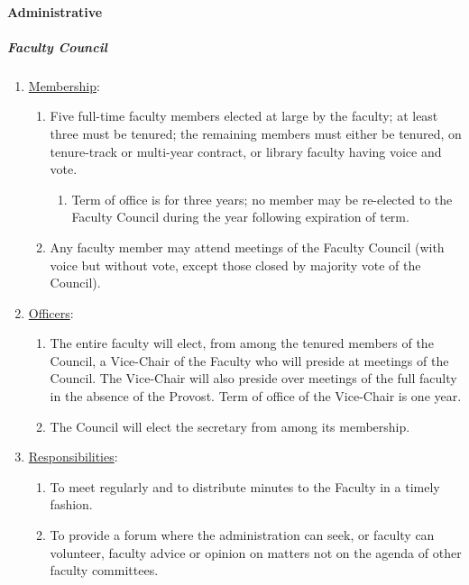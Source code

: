 			\paragraph{Administrative}
				\subparagraph{Faculty Council}
					\begin{enumerate}[label=\alph*)]
						\item{\underline{Membership}: 
							\begin{enumerate}[label=\arabic*)]
								\item{Five full-time faculty members elected at large by the faculty; at least three must be tenured; the remaining members must either be tenured, on tenure-track or multi-year contract, or library faculty having voice and vote.
									\begin{enumerate}[label=(\alph*)]
										\item{Term of office is for three years; no member may be re-elected to the Faculty Council during the year following expiration of term.}
									\end{enumerate}
								}
								\item{Any faculty member may attend meetings of the Faculty Council (with voice but without vote, except those closed by majority vote of the Council).}
							\end{enumerate}
						}
						\item{\underline{Officers}:
							\begin{enumerate}[label=\arabic*)]
								\item{The entire faculty will elect, from among the tenured members of the Council, a Vice-Chair of the Faculty who will preside at meetings of the Council.  The Vice-Chair will also preside over meetings of the full faculty in the absence of the Provost.  Term of office of the Vice-Chair is one year.}
								\item{The Council will elect the secretary from among its membership.}
							\end{enumerate}
						}
						\item{\underline{Responsibilities}:
							\begin{enumerate}[label=\arabic*)]
								\item{To meet regularly and to distribute minutes to the Faculty in a timely fashion.}
								\item{To provide a forum where the administration can seek, or faculty can volunteer, faculty advice or opinion on matters not on the agenda of other faculty committees.}

\end{enumerate}}
\end{enumerate}
